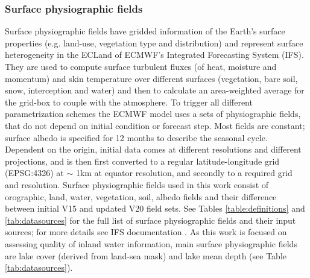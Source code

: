 \documentclass[hess, twostagejnl]{copernicus}
\begin{document}
\subsubsection{Surface physiographic fields}\label{sec:surface_physio}
\noindent Surface physiographic fields have gridded information of the Earth’s surface properties (e.g. land-use, vegetation type and distribution) and represent surface heterogeneity in the ECLand of ECMWF’s Integrated Forecasting System (IFS). They are used to compute surface turbulent fluxes (of heat, moisture and momentum) and skin temperature over different surfaces (vegetation, bare soil, snow, interception and water) and then to calculate an area-weighted average for the grid-box to couple with the atmosphere. To trigger all different parametrization schemes the ECMWF model uses a sets of physiographic fields, that do not depend on initial condition or forecast step. Most fields are constant; surface albedo is specified for 12 months to describe the seasonal cycle. Dependent on the origin, initial data comes at different resolutions and different projections, and is then first converted to a regular latitude-longitude grid (EPSG:4326) at $\sim$ 1km at equator resolution, and secondly to a required grid and resolution. Surface physiographic fields used in this work consist of orographic, land, water, vegetation, soil, albedo fields and their difference between initial V15 and updated V20 field sets. See Tables \ref{table:definitions} and \ref{tab:datasources} for the full list of surface physiographic fields and their input sources; for more details see IFS documentation \citep{IFSdocs}. As this work is focused on assessing quality of inland water information, main surface physiographic fields are lake cover (derived from land-sea mask) and lake mean depth (see Table \ref{tab:datasources}).  \newline 
\end{document}
